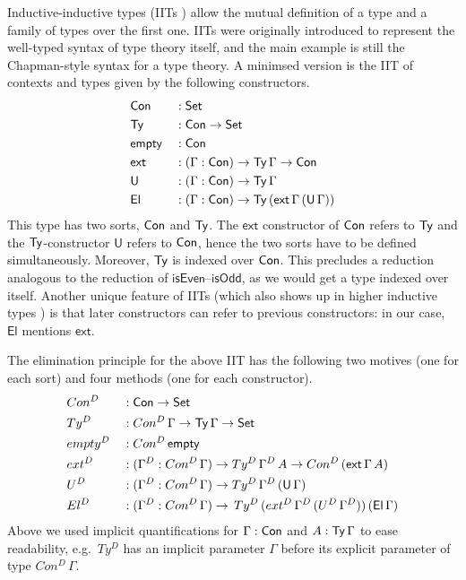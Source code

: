 \documentclass[a4paper,UKenglish,cleveref, autoref]{lipics-v2019}
\begin{document}
Inductive-inductive types (IITs \cite{forsberg-phd}) allow the mutual
definition of a type and a family of types over the first one. IITs
were originally introduced to represent the well-typed syntax of type
theory itself, and the main example is still the Chapman-style
\cite{chapman09eatitself} syntax for a type theory. A minimsed version
is the IIT of contexts and types given by the following constructors.
\begin{alignat*}{5}
  & \mathsf{Con} && : \mathsf{Set} \\
  & \mathsf{Ty} && : \mathsf{Con}\rightarrow\mathsf{Set} \\
  & \mathsf{empty} && : \mathsf{Con} \\
  & \mathsf{ext} && : (\Gamma:\mathsf{Con})\rightarrow\mathsf{Ty}\,\Gamma\rightarrow\mathsf{Con} \\
  & \mathsf{U} && : (\Gamma:\mathsf{Con})\rightarrow\mathsf{Ty}\,\Gamma \\
  & \mathsf{El} && : (\Gamma:\mathsf{Con})\rightarrow\mathsf{Ty}\,(\mathsf{ext}\,\Gamma\,(\mathsf{U}\,\Gamma))
\end{alignat*}
This type has two sorts, $\mathsf{Con}$ and $\mathsf{Ty}$. The $\mathsf{ext}$ constructor of
$\mathsf{Con}$ refers to $\mathsf{Ty}$ and the $\mathsf{Ty}$-constructor $\mathsf{U}$ refers to $\mathsf{Con}$,
hence the two sorts have to be defined simultaneously. Moreover, $\mathsf{Ty}$ is
indexed over $\mathsf{Con}$. This precludes a reduction analogous to the reduction of
$\mathsf{isEven}$--$\mathsf{isOdd}$, as we would get a type indexed over
itself. Another unique feature of IITs (which also shows up in higher inductive
types \cite{HoTTbook}) is that later constructors can refer to previous
constructors: in our case, $\mathsf{El}$ mentions
$\mathsf{ext}$.

The elimination principle for the above IIT has the following two
motives (one for each sort) and four methods (one for each
constructor).
\begin{alignat*}{5}
  & Con^D && : \mathsf{Con}\rightarrow\mathsf{Set} \\
  & Ty^D && : Con^D\,\Gamma\rightarrow\mathsf{Ty}\,\Gamma\rightarrow\mathsf{Set} \\
  & {empty}^D && : Con^D\,\mathsf{empty} \\
  & {ext}^D && : (\Gamma^D:Con^D\,\Gamma)\rightarrow Ty^D\,\Gamma^D\,A\rightarrow Con^D\,(\mathsf{ext}\,\Gamma\,A) \\
  & U^D && : (\Gamma^D:Con^D\,\Gamma)\rightarrow Ty^D\,\Gamma^D\,(\mathsf{U}\,\Gamma) \\
  & El^D && : (\Gamma^D:Con^D\,\Gamma)\rightarrow\,Ty^D\,({ext}^D\,\Gamma^D\,(U^D\,\Gamma^D))\,(\mathsf{El}\,\Gamma)
\end{alignat*}
Above we used implicit quantifications for $\Gamma:\mathsf{Con}$ and
$A:\mathsf{Ty}\,\Gamma$ to ease readability, e.g.\ $Ty^D$ has an implicit
parameter $\Gamma$ before its explicit parameter of type
$Con^D\,\Gamma$.
\end{document}
